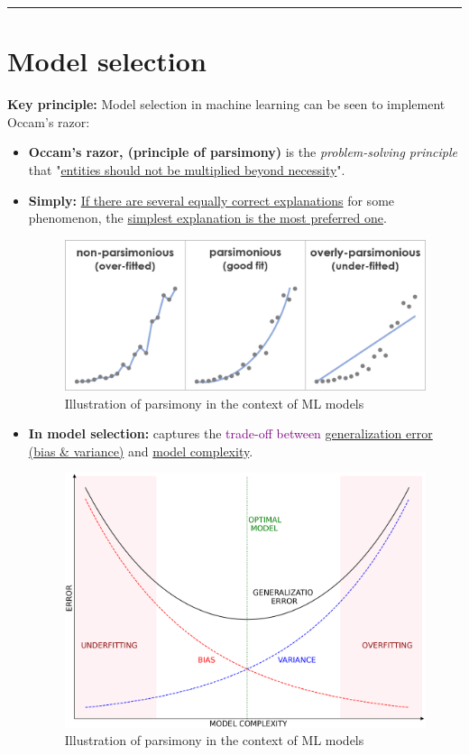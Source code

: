 \documentclass[12pt, a4paper]{article}
\let\stdsection\section
\renewcommand\section{\newpage\stdsection} %
\begin{document}
\begin{center}\rule{3in}{0.4pt}\end{center}


















\section{Model selection}\label{model-selection}

\textbf{Key principle:} Model selection in machine learning can be seen to implement Occam’s razor:

\begin{itemize}
  \item \textbf{Occam's razor, (principle of parsimony)} is the \textit{problem-solving principle} that "\uline{entities should not be multiplied beyond necessity}".
  \item \textbf{Simply:} \uline{If there are several equally correct explanations} for some phenomenon, the \uline{simplest explanation is the most preferred one}.
  \begin{figure}[H]
    \centering  %
      \includegraphics[width=0.6\columnwidth]{images/eg-of-parsimony.png}
      \caption{Illustration of parsimony in the context of ML models}
      \label{fig:eg-of-parsimony}
  \end{figure}
  \item \textbf{In model selection:} captures the \textcolor{Purple}{trade-off between} \uline{generalization error (bias \& variance)} and \uline{model complexity}.
  \begin{figure}[H]
    \centering  %
      \includegraphics[width=0.7\columnwidth]{images/bias-variance-tradeoff.png}
      \caption{Illustration of parsimony in the context of ML models}
      \label{fig:bias-variance-tradeoff}
  \end{figure}
\end{itemize}
\end{document}
